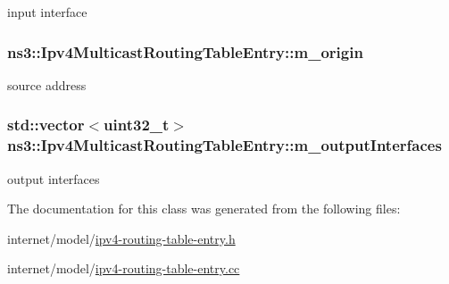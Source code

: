input interface 

\subsubsection[{\texorpdfstring{m\+\_\+origin}{m_origin}}]{ ns3\+::\+Ipv4\+Multicast\+Routing\+Table\+Entry\+::m\+\_\+origin\hspace{0.3cm}{\ttfamily [private]}}\hypertarget{classns3_1_1Ipv4MulticastRoutingTableEntry_a342b1ce482d42978451b4df62b8b4078}{}\label{classns3_1_1Ipv4MulticastRoutingTableEntry_a342b1ce482d42978451b4df62b8b4078}


source address 

\subsubsection[{\texorpdfstring{m\+\_\+output\+Interfaces}{m_outputInterfaces}}]{\setlength{\rightskip}{0pt plus 5cm}std\+::vector$<$uint32\+\_\+t$>$ ns3\+::\+Ipv4\+Multicast\+Routing\+Table\+Entry\+::m\+\_\+output\+Interfaces\hspace{0.3cm}{\ttfamily [private]}}\hypertarget{classns3_1_1Ipv4MulticastRoutingTableEntry_a69118bb9f1092643d77e4326d3de0721}{}\label{classns3_1_1Ipv4MulticastRoutingTableEntry_a69118bb9f1092643d77e4326d3de0721}


output interfaces 



The documentation for this class was generated from the following files\+:\begin{DoxyCompactItemize}
\item 
internet/model/\hyperlink{ipv4-routing-table-entry_8h}{ipv4-\/routing-\/table-\/entry.\+h}\item 
internet/model/\hyperlink{ipv4-routing-table-entry_8cc}{ipv4-\/routing-\/table-\/entry.\+cc}\end{DoxyCompactItemize}
